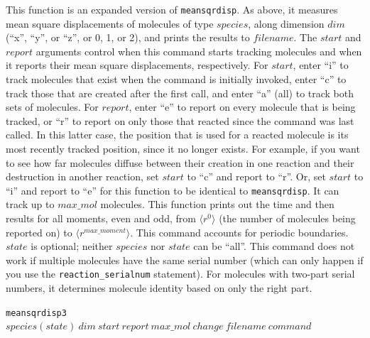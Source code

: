 \documentclass {scrbook}
\newcommand {\ttt} {\texttt}
\begin{document}
\begin{description}
This function is an expanded version of \ttt{meansqrdisp}. As above, it measures mean square displacements of molecules of type $species$, along dimension $dim$ (``x'', ``y'', or ``z'', or 0, 1, or 2), and prints the results to $filename$. The $start$ and $report$ arguments control when this command starts tracking molecules and when it reports their mean square displacements, respectively. For $start$, enter ``i'' to track molecules that exist when the command is initially invoked, enter ``c'' to track those that are created after the first call, and enter ``a'' (all) to track both sets of molecules. For $report$, enter ``e'' to report on every molecule that is being tracked, or ``r'' to report on only those that reacted since the command was last called. In this latter case, the position that is used for a reacted molecule is its most recently tracked position, since it no longer exists. For example, if you want to see how far molecules diffuse between their creation in one reaction and their destruction in another reaction, set $start$ to ``c'' and report to ``r''. Or, set $start$ to ``i'' and report to ``e'' for this function to be identical to \ttt{meansqrdisp}. It can track up to $max\_mol$ molecules. This function prints out the time and then results for all moments, even and odd, from $\langle r^0 \rangle$ (the number of molecules being reported on) to $\langle r^{max\_moment} \rangle$. This command accounts for periodic boundaries. $state$ is optional; neither $species$ nor $state$ can be ``all''. This command does not work if multiple molecules have the same serial number (which can only happen if you use the \ttt{reaction\_serialnum} statement). For molecules with two-part serial numbers, it determines molecule identity based on only the right part.

\item{\ttt{meansqrdisp3} $species(state)\ dim\ start\ report\ max\_mol\ change\ filename\ command$}


\end{description}
\end{document}
